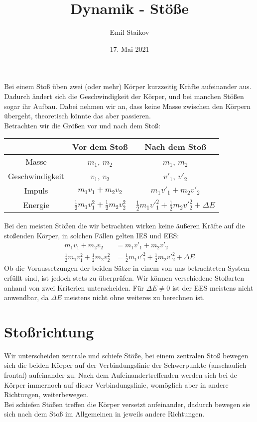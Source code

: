\documentclass[11pt]{article}
\title{Dynamik - Stöße}
\author{Emil Staikov}
\date{17. Mai 2021}
\begin{document}
\maketitle

Bei einem Stoß üben zwei (oder mehr) Körper kurzzeitig Kräfte aufeinander aus. Dadurch ändert sich die Geschwindigkeit der Körper, und bei manchen Stößen sogar ihr Aufbau. Dabei nehmen wir an, dass keine Masse zwischen den Körpern übergeht, theoretisch könnte das aber passieren. \\
Betrachten wir die Größen vor und nach dem Stoß: 
\begin{center}
\begin{tabular}{|c|c|c|}
    \hline 
    & Vor dem Stoß & Nach dem Stoß \\
    \hline 
    Masse & $m_1$, $m_2$ & $m_1$, $m_2$ \\
    \hline 
    Geschwindigkeit & $v_1$, $v_2$ & $v'_1$, $v'_2$ \\
    \hline 
    Impuls & $m_1v_1 + m_2v_2$ & $m_1v'_1 + m_2v'_2$ \\
    \hline 
    Energie & $\frac{1}{2}m_1v^2_1 + \frac{1}{2}m_2v^2_2$ & $\frac{1}{2}m_1v'^2_1 + \frac{1}{2}m_2v'^2_2 + \Delta E$ \\
    \hline
\end{tabular}
\end{center}
Bei den meisten Stößen die wir betrachten wirken keine äußeren Kräfte auf die stoßenden Körper, in solchen Fällen gelten IES und EES: 
\begin{align*}
    m_1v_1 + m_2v_2 &= m_1v'_1 + m_2v'_2 \\
    \frac{1}{2}m_1v^2_1 + \frac{1}{2}m_2v^2_2 &= \frac{1}{2}m_1v'^2_1 + \frac{1}{2}m_2v'^2_2 + \Delta E
\end{align*}
Ob die Voraussetzungen der beiden Sätze in einem von uns betrachteten System erfüllt sind, ist jedoch stets zu überprüfen. Wir können verschiedene Stoßarten anhand von zwei Kriterien unterscheiden. Für $\Delta E \neq 0$ ist der EES meistens nicht anwendbar, da $\Delta E$ meistens nicht ohne weiteres zu berechnen ist. 



\section{Stoßrichtung}
Wir unterscheiden zentrale und schiefe Stöße, bei einem zentralen Stoß bewegen sich die beiden Körper auf der Verbindungslinie der Schwerpunkte (anschaulich frontal) aufeinander zu. Nach dem Aufeinandertreffenden werden sich bei de Körper immernoch auf dieser Verbindungslinie, womöglich aber in andere Richtungen, weiterbewegen. \\
Bei schiefen Stößen treffen die Körper versetzt aufeinander, dadurch bewegen sie sich nach dem Stoß im Allgemeinen in jeweils andere Richtungen.
\end{document}
